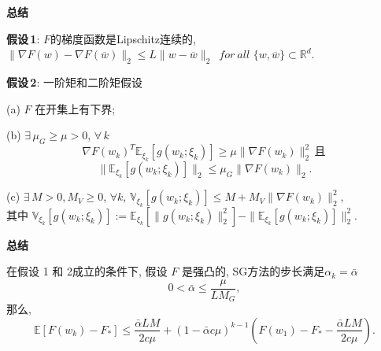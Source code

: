 \documentclass[handout]{beamer}
\begin{document}
\begin{frame}
{\textbf{总结}}

\textbf{假设\,1}:
 $F$的梯度函数是Lipschitz连续的,
$\|\nabla F(w) - \nabla F(\overline w)\|_2\leq L\|w - \overline w\|_2 \,\, \,for \ all\,\, \{w, \overline{w} \}\subset \mathbb{R}^d.$

\bigskip 

\textbf{假设\,2}: 一阶矩和二阶矩假设

(a) $F$ 在开集上有下界;

(b)  $\exists\,\mu_G \geq \mu > 0$, $\forall\,k$
$$\nabla F(w_k)^T \mathbb{E}_{\xi_k}[g(w_k; \xi_k)] \geq \mu\|\nabla F(w_k)\|^2_2 \,\text{且}\,$$
$$\|\mathbb{E}_{\xi_k}[g(w_k; \xi_k)]\|_2\leq \mu_G\|\nabla F(w_k)\|_2.$$

(c)   $\exists\,M> 0, M_V \geq 0$, $\forall k$, $\mathbb{V}_{\xi_k}[g(w_k; \xi_k)] \leq M + M_V \|\nabla F(w_k)\|^2_2,$ \\
其中
$\mathbb{V}_{\xi_k}[g(w_k; \xi_k)] := \mathbb{E}_{\xi_k}[\|g(w_k; \xi_k)\|^2_2] - \|\mathbb{E}_{\xi_k}[g(w_k; \xi_k)]\|^2_2.$

\end{frame}



\begin{frame}
{\textbf{总结}}


\begin{theorem}[强凸, 固定步长]
在假设 1 和 2成立的条件下, 假设 $F$ 是强凸的, SG方法的步长满足$\alpha_k = \bar{\alpha}$ 
$$ 0 < \bar \alpha\leq \frac{\mu}{L M_G},$$
那么,
$$\mathbb{E}[F(w_k)- F_*] \leq \frac{\bar\alpha L M}{2c\mu}+(1-\bar\alpha c \mu)^{k-1}
\left(F(w_1)-F_*-\frac{\bar\alpha L M}{2c\mu}\right).$$
\end{theorem}


\end{frame}
\end{document}
